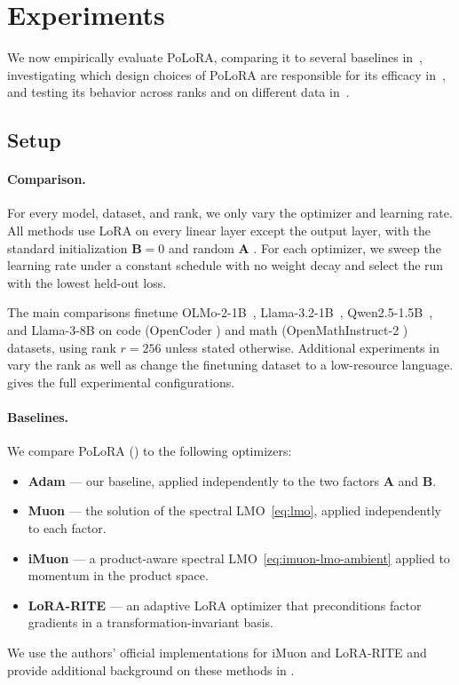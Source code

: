 \documentclass{article}
\newcommand{\mat}[1]{\bm{#1}}
\newcommand{\methodname}{PoLoRA\xspace}
\begin{document}
\section{Experiments}
\label{sec:exp}

We now empirically evaluate \methodname{}, comparing it to several baselines in~, investigating which design choices of \methodname{} are responsible for its efficacy in~, and testing its behavior across ranks and on different data in~.

\subsection{Setup}
\label{sec:exp-setup}

\paragraph{Comparison.}
For every model, dataset, and rank, we only vary the optimizer and learning rate. All methods use LoRA on every linear layer except the output layer, with the standard initialization $\mat{B}=0$ and random $\mat{A}$ \cite{lora}. For each optimizer, we sweep the learning rate under a constant schedule with no weight decay and select the run with the lowest held-out loss.

The main comparisons finetune OLMo-2-1B~\cite{olmo2}, Llama-3.2-1B~\cite{llama3}, Qwen2.5-1.5B~\cite{qwen25}, and Llama-3-8B on code (OpenCoder \cite{opencoder}) and math (OpenMathInstruct-2 \cite{openmathinstruct2}) datasets, using rank $r=256$ unless stated otherwise. Additional experiments in  vary the rank as well as change the finetuning dataset to a low-resource language.  gives the full experimental configurations.

\paragraph{Baselines.} We compare \methodname{} () to the following optimizers:
\begin{itemize}[leftmargin=1.5em,itemsep=1pt,topsep=2pt]
  \item \textbf{Adam} \cite{adam} --- our baseline, applied independently to the two factors $\mat{A}$ and $\mat{B}$.
  \item \textbf{Muon} \cite{muon} --- the solution of the spectral LMO~\eqref{eq:lmo}, applied independently to each factor.
  \item \textbf{iMuon} \cite{imuon} --- a product-aware spectral LMO~\eqref{eq:imuon-lmo-ambient} applied to momentum in the product space.
  \item \textbf{LoRA-RITE} \cite{lorarite} --- an adaptive LoRA optimizer that preconditions factor gradients in a transformation-invariant basis.
\end{itemize}
We use the authors' official implementations for iMuon and LoRA-RITE and provide additional background on these methods in . 
\end{document}
